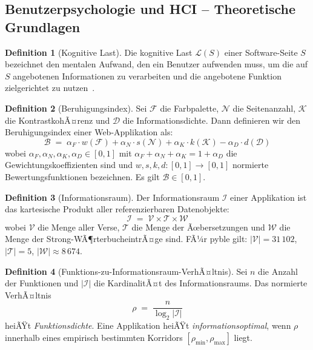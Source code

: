 ﻿\documentclass[a4paper,12pt]{article}
\theoremstyle{definition}
\newtheorem{definition}{Definition}
\begin{document}
\subsection{Benutzerpsychologie und HCI -- Theoretische Grundlagen}

\begin{definition}[Kognitive Last]
    Die kognitive Last $\mathcal{L}(S)$ einer Software-Seite $S$ bezeichnet den
    mentalen Aufwand, den ein Benutzer aufwenden muss, um die auf $S$ angebotenen
    Informationen zu verarbeiten und die angebotene Funktion zielgerichtet zu
    nutzen~\cite{sweller1988}.
\end{definition}

\begin{definition}[Beruhigungsindex]
\label{def:beruhigung}
    Sei $\mathcal{F}$ die Farbpalette, $\mathcal{N}$ die Seitenanzahl, $\mathcal{K}$
    die KontrastkohÃ¤renz und $\mathcal{D}$ die Informationsdichte. Dann definieren
    wir den Beruhigungsindex einer Web-Applikation als:
    \[
        \mathcal{B} \;=\; \alpha_F \cdot w(\mathcal{F})
                        + \alpha_N \cdot s(\mathcal{N})
                        + \alpha_K \cdot k(\mathcal{K})
                        - \alpha_D \cdot d(\mathcal{D})
    \]
    wobei $\alpha_F, \alpha_N, \alpha_K, \alpha_D \in [0,1]$ mit
    $\alpha_F + \alpha_N + \alpha_K = 1 + \alpha_D$ die Gewichtungskoeffizienten
    sind und $w, s, k, d : [0,1] \to [0,1]$ normierte Bewertungsfunktionen
    bezeichnen. Es gilt $\mathcal{B} \in [0,1]$.
\end{definition}

\begin{definition}[Informationsraum]
    Der Informationsraum $\mathcal{I}$ einer Applikation ist das kartesische Produkt
    aller referenzierbaren Datenobjekte:
    \[
        \mathcal{I} \;=\; \mathcal{V} \times \mathcal{T} \times \mathcal{W}
    \]
    wobei $\mathcal{V}$ die Menge aller Verse, $\mathcal{T}$ die Menge der
    Ãœbersetzungen und $\mathcal{W}$ die Menge der Strong-WÃ¶rterbucheintrÃ¤ge sind.
    FÃ¼r pyble gilt: $|\mathcal{V}| = 31\,102$, $|\mathcal{T}| = 5$,
    $|\mathcal{W}| \approx 8\,674$.
\end{definition}

\begin{definition}[Funktions-zu-Informationsraum-VerhÃ¤ltnis]
\label{def:fi}
    Sei $n$ die Anzahl der Funktionen und $|\mathcal{I}|$ die KardinalitÃ¤t des
    Informationsraums. Das normierte VerhÃ¤ltnis
    \[
        \rho \;=\; \frac{n}{\log_2 |\mathcal{I}|}
    \]
    heiÃŸt \emph{Funktionsdichte}. Eine Applikation heiÃŸt \emph{informationsoptimal},
    wenn $\rho$ innerhalb eines empirisch bestimmten Korridors
    $[\rho_{\min}, \rho_{\max}]$ liegt.
\end{definition}
\end{document}
